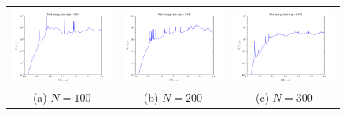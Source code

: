 \documentclass{article}
\begin{document}
\begin{multicols}{2}
\begin{figure}[t!]
\begin{center}
\begin{tabular}{ccc}
  	\includegraphics[width=60mm]{Images/Ek_100stars.png}
	& \includegraphics[width=60mm]{Images/Ek_200stars.png}
	& \includegraphics[width=60mm]{Images/Ek_300stars.png} \\
	(a) $N = 100$		& (b) $N = 200$  	& (c) $N = 300$ \\[6pt]
	

\end{tabular}
\end{center}
\end{figure}
\end{multicols}
\end{document}
